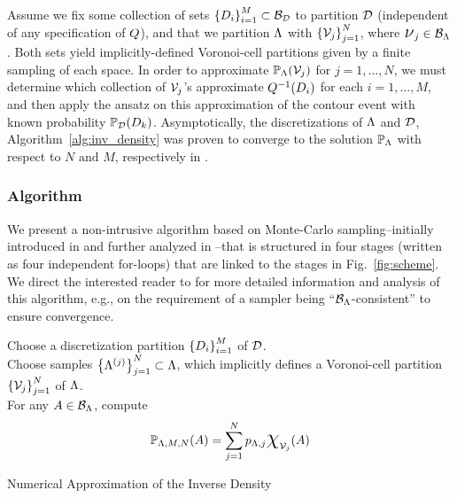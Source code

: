 Assume we fix some collection of sets $\left\{D_i\right\}_{i=1}^{M} \subset \mathcal{B}_{\mathcal{D}}$ to partition $\mathcal{D}$ (independent of any specification of $Q$), and that we partition ${\Lambda}$ with $\left\{\mathcal{V}_j\right\}_{j=1}^{N}$, where $\mbox{\Large$\nu$}_j \in \mathcal{B}_{{\Lambda}}$. 
Both sets yield implicitly-defined Voronoi-cell partitions given by a finite sampling of each space.
In order to approximate $\mathbb{P}_{\Lambda}(\mathcal{V}_j)$ for $j=1,\hdots,N$, we must determine which collection of $\mathcal{V}_j$'s approximate $Q^{-1}(D_i)$ for each $i=1,\hdots,M$, and then apply the ansatz on this approximation of the contour event with known probability $\mathbb{P}_{\mathcal{D}}(D_k)$.
Asymptotically, the discretizations of ${\Lambda}$ and $\mathcal{D}$, Algorithm~\ref{alg:inv_density} was proven to converge to the solution $\mathbb{P}_{\Lambda}$ with respect to ${N \text{ and } M}$, respectively in \cite{BET+14-arxiv}. 



\subsubsection{Algorithm}\label{sec:algorithm}
We present a non-intrusive algorithm based on Monte-Carlo sampling\---initially introduced in \cite{BET+14} and further analyzed in \cite{BET+14-arxiv}\---that is structured in four stages (written as four independent for-loops) that are linked to the stages in Fig.~\ref{fig:scheme}. 
We direct the interested reader to \cite{BET+14-arxiv} for more detailed information and analysis of this algorithm, e.g., on the requirement of a sampler being ``$\mathcal{B}_{{\Lambda}}$-consistent'' to ensure convergence. 


\begin{algorithm}[hbtp]
\DontPrintSemicolon
Choose a discretization partition $\left\{D_i\right\}_{i=1}^{M}$ of $\mathcal{D}$.\\
	Choose samples $\left\{{\Lambda}^{(j)}\right\}_{j=1}^{N} \subset {\Lambda}$, which implicitly defines a Voronoi-cell partition $\left\{\mathcal{V}_j\right\}_{j=1}^{N}$ of ${\Lambda}$.\\
	For any $A\in \mathcal{B}_{{\Lambda}}$, compute 
	\begin{equation}
	\PP_{\pspace, M, N} (A) = \sum_{j=1}^N p_{\pspace, j} \Chi_{\VV_j} (A) 
	\end{equation}
 \caption{Numerical Approximation of the Inverse Density}
 \label{alg:inv_density}
\end{algorithm}
\FloatBarrier

